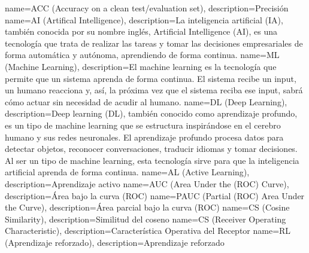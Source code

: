       {name={ACC (Accuracy on a clean test/evaluation set)},  description={Precisión}}
       {name={AI (Artifical Intelligence)},                    description={La inteligencia artificial (IA), también conocida por su nombre inglés, Artificial Intelligence (AI), es una tecnología que trata de realizar las tareas y tomar las decisiones empresariales de forma automática y autónoma, aprendiendo de forma continua. \cite{glosario-tic-artificial-intelligence}}}
       {name={ML (Machine Learning)},                          description={El machine learning es la tecnología que permite que un sistema aprenda de forma continua. El sistema recibe un input, un humano reacciona y, así, la próxima vez que el sistema reciba ese input, sabrá cómo actuar sin necesidad de acudir al humano. \cite{glosario-tic-machine-learning}}}
       {name={DL (Deep Learning)},                             description={Deep learning (DL), también conocido como aprendizaje profundo, es un tipo de machine learning que se estructura inspirándose en el cerebro humano y sus redes neuronales. El aprendizaje profundo procesa datos para detectar objetos, reconocer conversaciones, traducir idiomas y tomar decisiones. Al ser un tipo de machine learning, esta tecnología sirve para que la inteligencia artificial aprenda de forma continua. \cite{glosario-tic-deep-learning}}}
       {name={AL (Active Learning)},                           description={Aprendizaje activo}}
      {name={AUC (Area Under the (ROC) Curve)},               description={Área bajo la curva (ROC)}}
     {name={PAUC (Partial (ROC) Area Under the Curve)},      description={Área parcial bajo la curva (ROC)}}
       {name={CS (Cosine Similarity)},                         description={Similitud del coseno}}
      {name={CS (Receiver Operating Characteristic)},         description={Característica Operativa del Receptor}}
       {name={RL (Aprendizaje reforzado)},                     description={Aprendizaje reforzado}}


